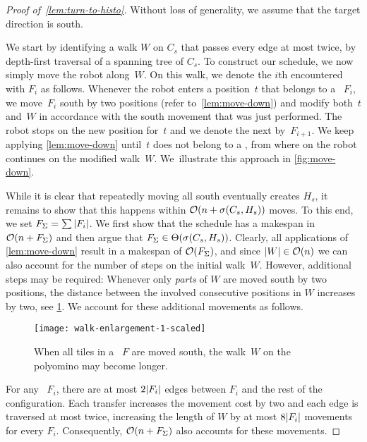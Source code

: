 \begin{proof}[Proof of~\cref{lem:turn-to-histo}]
	Without loss of generality, we assume that the target direction is south.

	We start by identifying a walk $W$ on $C_s$ that passes every edge at most twice, by depth-first traversal of a spanning tree of $C_s$.
	To construct our schedule, we now simply move the robot along~$W$.
	On this walk, we denote the $i$th encountered \comp{} with $F_i$ as follows.
	Whenever the robot enters a position~$t$ that belongs to a \comp{}~$F_i$, we move~$F_i$ south by two positions (refer to~\cref{lem:move-down}) and modify both~$t$ and~$W$ in accordance with the south movement that was just performed.
	The robot stops on the new position for~$t$ and we denote the next \comp{} by~$F_{i+1}$.
	We keep applying \cref{lem:move-down} until~$t$ does not belong to a \comp{}, from where on the robot continues on the modified walk~$W$.
	We~illustrate this approach in \cref{fig:move-down}.

	While it is clear that repeatedly moving all \comps{} south eventually creates $H_s$, it remains to show that this happens within $\mathcal{O}(n + \sigma(C_s,H_s))$ moves.
	To this end, we set $F_\Sigma = \sum |F_i|$.
	We first show that the schedule has a makespan in $\mathcal{O}(n + F_\Sigma)$ and then argue that $F_\Sigma \in \Theta(\sigma(C_s, H_s))$.
	Clearly, all applications of \cref{lem:move-down} result in a makespan of $\mathcal{O}(F_\Sigma)$, and since $|W| \in \mathcal{O}(n)$ we can also account for the number of steps on the initial walk~$W$.
	However, additional steps may be required:
	Whenever only \emph{parts} of $W$ are moved south by two positions, the distance between the involved consecutive positions in $W$ increases by two, see \cref{fig:walk-enlargement}.
	We account for these additional movements as follows.

	\begin{figure}[htb]
		\centering%
		\texttt{[image: walk-enlargement-1-scaled]}%
		\caption{%
			When all tiles in a \comp{}~$F$ are moved south, the walk~$W$ on the polyomino may become longer.
		}
		\label{fig:walk-enlargement}
	\end{figure}

	For any \comp{}~$F_i$, there are at most $2|F_i|$ edges between $F_i$ and the rest of the configuration.
	Each transfer increases the movement cost by two and each edge is traversed at most twice, increasing the length of $W$ by at most $8|F_i|$ movements for every $F_i$.
	Consequently, $\mathcal{O}(n + F_\Sigma)$ also accounts for these movements.


\end{proof}
